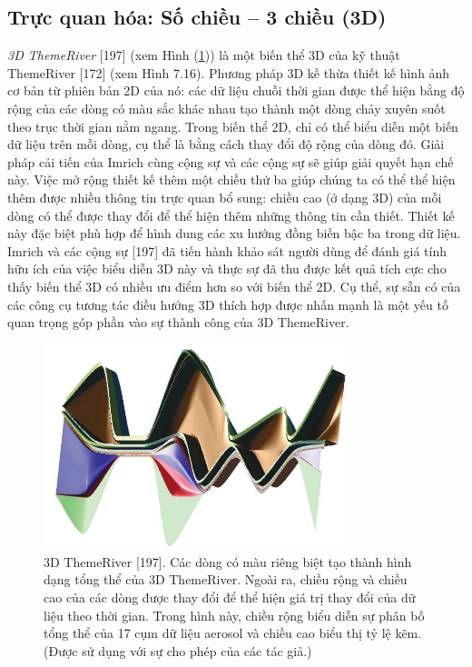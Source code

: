 \subsection{Trực quan hóa: Số chiều – 3 chiều (3D)}
\textit{3D ThemeRiver} [197] (xem Hình (\ref{fig:f7.15})) là một biến thể 3D của kỹ thuật ThemeRiver [172] (xem Hình 7.16). Phương pháp 3D kế thừa thiết kế hình ảnh cơ bản từ phiên bản 2D của nó: các dữ liệu chuỗi thời gian được thể hiện bằng độ rộng của các dòng có màu sắc khác nhau tạo thành một dòng chảy xuyên suốt theo trục thời gian nằm ngang. Trong biến thể 2D, chỉ có thể biểu diễn một biến dữ liệu trên mỗi dòng, cụ thể là bằng cách thay đổi độ rộng của dòng đó. Giải pháp cải tiến của Imrich cùng cộng sự và các cộng sự sẽ giúp giải quyết hạn chế này. Việc mở rộng thiết kế thêm một chiều thứ ba giúp chúng ta có thể thể hiện thêm được nhiều thông tin trực quan bổ sung: chiều cao (ở dạng 3D) của mỗi dòng có thể được thay đổi để thể hiện thêm những thông tin cần thiết. Thiết kế này đặc biệt phù hợp để hình dung các xu hướng đồng biến bậc ba trong dữ liệu. Imrich và các cộng sự [197] đã tiến hành khảo sát người dùng để đánh giá tính hữu ích của việc biểu diễn 3D này và thực sự đã thu được kết quả tích cực cho thấy biến thể 3D có nhiều ưu điểm hơn so với biến thể 2D. Cụ thể, sự sẵn có của các công cụ tương tác điều hướng 3D thích hợp được nhấn mạnh là một yếu tố quan trọng góp phần vào sự thành công của 3D ThemeRiver.
\begin{figure}[H] %
    \centering %
    \includegraphics[width=0.8\textwidth]{assets/fig_7_15.png} 
    \caption{3D ThemeRiver [197]. Các dòng có màu riêng biệt tạo thành hình dạng tổng thể của 3D ThemeRiver. Ngoài ra, chiều rộng và chiều cao của các dòng được thay đổi để thể hiện giá trị thay đổi của dữ liệu theo thời gian. Trong hình này, chiều rộng biểu diễn sự phân bố tổng thể của 17 cụm dữ liệu aerosol và chiều cao biểu thị tỷ lệ kẽm. (Được sử dụng với sự cho phép của các tác giả.)} %
    \label{fig:f7.15}
\end{figure}
